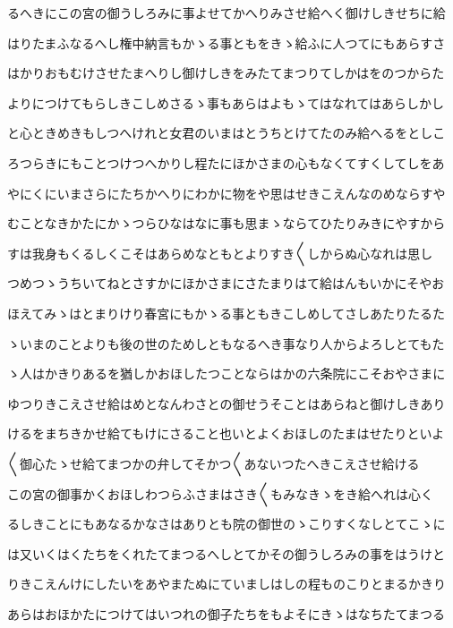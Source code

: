 \documentclass[a4paper,11pt,landscape]{ltjtarticle}
\begin{document}
\par\medskip
るへきにこの宮の御うしろみに事よせてかへりみさせ給へく御けしきせちに給
\par\medskip
はりたまふなるへし権中納言もかゝる事ともをきゝ給ふに人つてにもあらすさ
\par\medskip
はかりおもむけさせたまへりし御けしきをみたてまつりてしかはをのつからた
\par\medskip
よりにつけてもらしきこしめさるゝ事もあらはよもゝてはなれてはあらしかし
\par\medskip
と心ときめきもしつへけれと女君のいまはとうちとけてたのみ給へるをとしこ
\par\medskip
ろつらきにもことつけつへかりし程たにほかさまの心もなくてすくしてしをあ
\par\medskip
やにくにいまさらにたちかへりにわかに物をや思はせきこえんなのめならすや
\par\medskip
むことなきかたにかゝつらひなはなに事も思まゝならてひたりみきにやすから
\par\medskip
すは我身もくるしくこそはあらめなともとよりすき〱しからぬ心なれは思し
\par\medskip
つめつゝうちいてねとさすかにほかさまにさたまりはて給はんもいかにそやお
\par\medskip
ほえてみゝはとまりけり春宮にもかゝる事ともきこしめしてさしあたりたるた
\par\medskip
ゝいまのことよりも後の世のためしともなるへき事なり人からよろしとてもた
\par\medskip
ゝ人はかきりあるを猶しかおほしたつことならはかの六条院にこそおやさまに
\par\medskip
ゆつりきこえさせ給はめとなんわさとの御せうそことはあらねと御けしきあり
\par\medskip
けるをまちきかせ給てもけにさること也いとよくおほしのたまはせたりといよ
\par\medskip
〱御心たゝせ給てまつかの弁してそかつ〱あないつたへきこえさせ給ける
\par\medskip
この宮の御事かくおほしわつらふさまはさき〱もみなきゝをき給へれは心く
\par\medskip
るしきことにもあなるかなさはありとも院の御世のゝこりすくなしとてこゝに
\par\medskip
は又いくはくたちをくれたてまつるへしとてかその御うしろみの事をはうけと
\par\medskip
りきこえんけにしたいをあやまたぬにていましはしの程ものこりとまるかきり
\par\medskip
あらはおほかたにつけてはいつれの御子たちをもよそにきゝはなちたてまつる
\par\medskip
\end{document}
